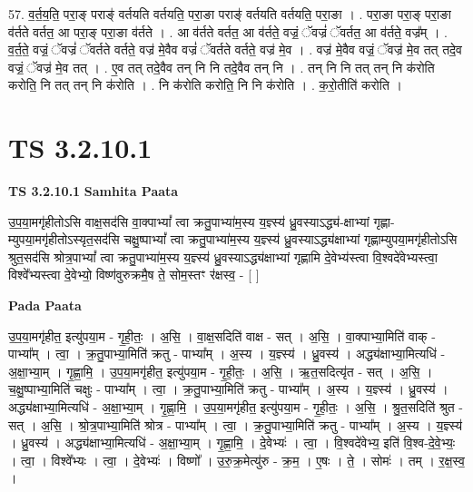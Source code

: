 \documentclass[17pt]{extarticle}
\begin{document}
57. व॒र्त॒य॒ति॒ परा॒ङ् पराङ्॑ वर्तयति वर्तयति॒ परा॒ङा पराङ्॑ वर्तयति वर्तयति॒ परा॒ङा । . परा॒ङा परा॒ङ् परा॒ङा व॑र्तते वर्तत॒ आ परा॒ङ् परा॒ङा व॑र्तते । . आ व॑र्तते वर्तत॒ आ व॑र्तते॒ वज्रं॒ ॅवज्रं॑ ॅवर्तत॒ आ व॑र्तते॒ वज्र᳚म् । . व॒र्त॒ते॒ वज्रं॒ ॅवज्रं॑ ॅवर्तते वर्तते॒ वज्र॑ मे॒वैव वज्रं॑ ॅवर्तते वर्तते॒ वज्र॑ मे॒व । . वज्र॑ मे॒वैव वज्रं॒ ॅवज्र॑ मे॒व तत् तदे॒व वज्रं॒ ॅवज्र॑ मे॒व तत् । . ए॒व तत् तदे॒वैव तन् नि नि तदे॒वैव तन् नि । . तन् नि नि तत् तन् नि क॑रोति करोति॒ नि तत् तन् नि क॑रोति । . नि क॑रोति करोति॒ नि नि क॑रोति । . क॒रो॒तीति॑ करोति । \newline
\pagebreak
{}

\section{ TS 3.2.10.1 }

\textbf{TS 3.2.10.1 } \newline
\textbf{Samhita Paata} \newline

उ॒प॒या॒मगृ॑हीतोऽसि वाक्ष॒सद॑सि वा॒क्पाभ्यां᳚ त्वा क्रतु॒पाभ्या॑म॒स्य य॒ज्ञ्स्य॑ ध्रु॒वस्याऽद्ध्य॑-क्षाभ्यां गृह्णा-म्युपया॒मगृ॑हीतोऽस्यृत॒सद॑सि चक्षु॒ष्पाभ्यां᳚ त्वा क्रतु॒पाभ्या॑म॒स्य य॒ज्ञ्स्य॑ ध्रु॒वस्याऽद्ध्य॑क्षाभ्यां गृह्णाम्युपया॒मगृ॑हीतोऽसि श्रुत॒सद॑सि श्रोत्र॒पाभ्यां᳚ त्वा क्रतु॒पाभ्या॑म॒स्य य॒ज्ञ्स्य॑ ध्रु॒वस्याऽद्ध्य॑क्षाभ्यां गृह्णामि दे॒वेभ्य॑स्त्वा वि॒श्वदे॑वेभ्यस्त्वा॒ विश्वे᳚भ्यस्त्वा दे॒वेभ्यो॒ विष्ण॑वुरुक्रमै॒ष ते॒ सोम॒स्तꣳ र॑क्षस्व॒ - [  ] \newline

\textbf{Pada Paata} \newline

उ॒प॒या॒मगृ॑हीत॒ इत्यु॑पया॒म - गृ॒ही॒तः॒ । अ॒सि॒ । वा॒क्ष॒सदिति॑ वाक्ष - सत् । अ॒सि॒ । वा॒क्पाभ्या॒मिति॑ वाक् - पाभ्या᳚म् । त्वा॒ । क्र॒तु॒पाभ्या॒मिति॑ क्रतु - पाभ्या᳚म् । अ॒स्य । य॒ज्ञ्स्य॑ । ध्रु॒वस्य॑ । अद्ध्य॑क्षाभ्या॒मित्यधि॑ - अ॒क्षा॒भ्या॒म् । गृ॒ह्णा॒मि॒ । उ॒प॒या॒मगृ॑हीत॒ इत्यु॑पया॒म - गृ॒ही॒तः॒ । अ॒सि॒ । ऋ॒त॒सदित्यृ॑त - सत् । अ॒सि॒ । च॒क्षु॒ष्पाभ्या॒मिति॑ चक्षुः - पाभ्या᳚म् । त्वा॒ । क्र॒तु॒पाभ्या॒मिति॑ क्रतु - पाभ्या᳚म् । अ॒स्य । य॒ज्ञ्स्य॑ । ध्रु॒वस्य॑ । अद्ध्य॑क्षाभ्या॒मित्यधि॑ - अ॒क्षा॒भ्या॒म् । गृ॒ह्णा॒मि॒ । उ॒प॒या॒मगृ॑हीत॒ इत्यु॑पया॒म - गृ॒ही॒तः॒ । अ॒सि॒ । श्रु॒त॒सदिति॑ श्रुत - सत् । अ॒सि॒ । श्रो॒त्र॒पाभ्या॒मिति॑ श्रोत्र - पाभ्या᳚म् । त्वा॒ । क्र॒तु॒पाभ्या॒मिति॑ क्रतु - पाभ्या᳚म् । अ॒स्य । य॒ज्ञ्स्य॑ । ध्रु॒वस्य॑ । अद्ध्य॑क्षाभ्या॒मित्यधि॑ - अ॒क्षा॒भ्या॒म् । गृ॒ह्णा॒मि॒ । दे॒वेभ्यः॑ । त्वा॒ । वि॒श्वदे॑वेभ्य॒ इति॑ वि॒श्व-दे॒वे॒भ्यः॒ । त्वा॒ । विश्वे᳚भ्यः । त्वा॒ । दे॒वेभ्यः॑ । विष्णो᳚ । उ॒रु॒क्र॒मेत्यु॑रु - क्र॒म॒ । ए॒षः । ते॒ । सोमः॑ । तम् । र॒क्ष॒स्व॒ ।  \newline
\end{document}
